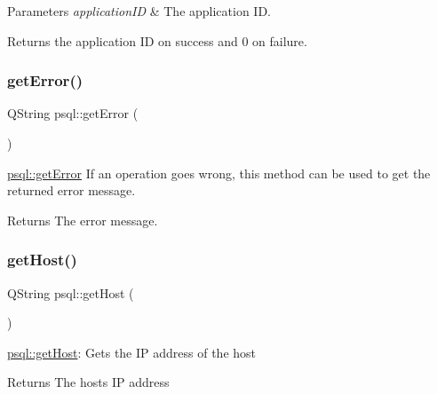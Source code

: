 \begin{DoxyParams}{Parameters}
{\em application\+ID} & The application ID. \\
\hline
\end{DoxyParams}
\begin{DoxyReturn}{Returns}
the application ID on success and 0 on failure. 
\end{DoxyReturn}
\mbox{\label{classpsql_a5f51e254b67ff932f287df2184ccc043}} 
\subsubsection{\texorpdfstring{get\+Error()}{getError()}}
{\footnotesize\ttfamily Q\+String psql\+::get\+Error (\begin{DoxyParamCaption}{ }\end{DoxyParamCaption})}



\mbox{\hyperlink{classpsql_a5f51e254b67ff932f287df2184ccc043}{psql\+::get\+Error}} If an operation goes wrong, this method can be used to get the returned error message. 

\begin{DoxyReturn}{Returns}
The error message. 
\end{DoxyReturn}
\mbox{\label{classpsql_a95d06ee661db0b9cf72605b983b04613}} 
\subsubsection{\texorpdfstring{get\+Host()}{getHost()}}
{\footnotesize\ttfamily Q\+String psql\+::get\+Host (\begin{DoxyParamCaption}{ }\end{DoxyParamCaption})}



\mbox{\hyperlink{classpsql_a95d06ee661db0b9cf72605b983b04613}{psql\+::get\+Host}}\+: Gets the IP address of the host 

\begin{DoxyReturn}{Returns}
The host\textquotesingle{}s IP address 
\end{DoxyReturn}
\mbox{\label{classpsql_aca1b2273937491e113089c1547caf49b}} 
